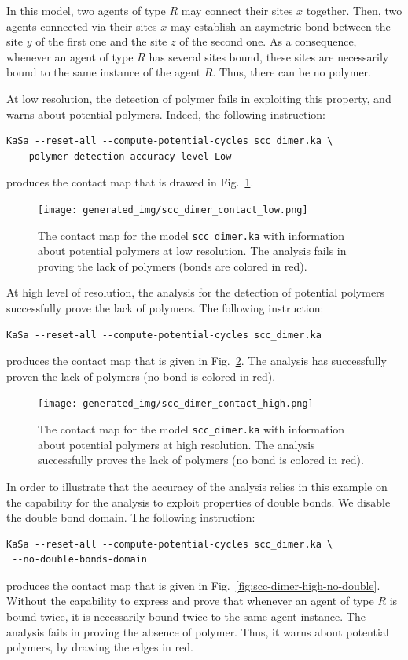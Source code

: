 \documentclass[11pt]{book}
\begin{document}
In this model, two agents of type $R$ may connect their sites $x$ together. Then, two agents connected via their sites $x$ may establish an asymetric bond between the site $y$ of the first one and the site $z$ of the second one.
As a consequence, whenever an agent of type $R$ has several sites bound, these sites are necessarily bound to the same instance of the agent $R$. Thus, there can be no polymer.

At low resolution, the detection of polymer fails in exploiting this property, and warns about potential polymers. Indeed, the following instruction:
\begin{verbatim}
KaSa --reset-all --compute-potential-cycles scc_dimer.ka \
  --polymer-detection-accuracy-level Low
\end{verbatim}
produces the contact map that is drawed in Fig.~\ref{fig:scc-dimer-low}.


\begin{figure}[htbp]
\centering
\texttt{[image: generated\_img/scc\_dimer\_contact\_low.png]}
\caption{The contact map for the model \texttt{scc\_dimer.ka} with information about potential polymers at low resolution. The analysis fails in proving the lack of polymers (bonds are colored in red).}
\label{fig:scc-dimer-low}
\end{figure}

At high level of resolution, the analysis for the detection of potential polymers successfully prove the lack of polymers. The following instruction:
\begin{verbatim}
KaSa --reset-all --compute-potential-cycles scc_dimer.ka
\end{verbatim}
produces the contact map that is given in Fig.~\ref{fig:scc-dimer-high}. The analysis has successfully proven the lack of polymers (no bond is colored in red).

\begin{figure}[htbp]
\centering
\texttt{[image: generated\_img/scc\_dimer\_contact\_high.png]}
\caption{The contact map for the model \texttt{scc\_dimer.ka} with information about potential polymers at high resolution. The analysis successfully proves the lack of polymers (no bond is colored in red).}
\label{fig:scc-dimer-high}
\end{figure}

In order to illustrate that the accuracy of the analysis relies in this example on the capability for the analysis to exploit properties of double bonds. We disable the double bond domain. The following instruction:
\begin{verbatim}
KaSa --reset-all --compute-potential-cycles scc_dimer.ka \
 --no-double-bonds-domain
\end{verbatim}
produces the contact map that is given in Fig.~\ref{fig:scc-dimer-high-no-double}. Without the capability to express and prove that whenever an agent of type $R$ is bound twice, it is necessarily bound twice to the same agent instance. The analysis fails in proving the absence of polymer. Thus, it warns about potential polymers, by drawing the edges in red.
\end{document}

